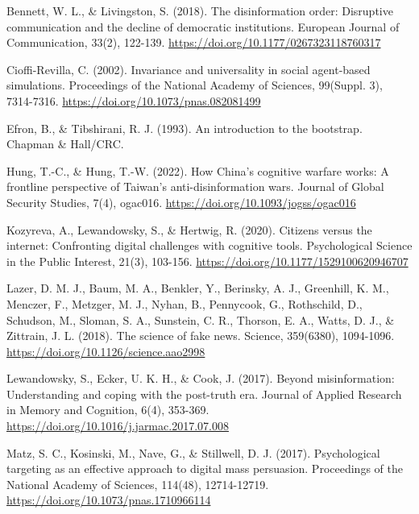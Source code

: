 \documentclass[11pt]{article}
\begin{document}
\noindent Bennett, W. L., \& Livingston, S. (2018). The disinformation order: Disruptive communication and the decline of democratic institutions. European Journal of Communication, 33(2), 122-139. \url{https://doi.org/10.1177/0267323118760317}\par

\noindent Cioffi-Revilla, C. (2002). Invariance and universality in social agent-based simulations. Proceedings of the National Academy of Sciences, 99(Suppl. 3), 7314-7316. \url{https://doi.org/10.1073/pnas.082081499}\par

\noindent Efron, B., \& Tibshirani, R. J. (1993). An introduction to the bootstrap. Chapman \& Hall/CRC.\par

\noindent Hung, T.-C., \& Hung, T.-W. (2022). How China's cognitive warfare works: A frontline perspective of Taiwan's anti-disinformation wars. Journal of Global Security Studies, 7(4), ogac016. \url{https://doi.org/10.1093/jogss/ogac016}\par

\noindent Kozyreva, A., Lewandowsky, S., \& Hertwig, R. (2020). Citizens versus the internet: Confronting digital challenges with cognitive tools. Psychological Science in the Public Interest, 21(3), 103-156. \url{https://doi.org/10.1177/1529100620946707}\par

\noindent Lazer, D. M. J., Baum, M. A., Benkler, Y., Berinsky, A. J., Greenhill, K. M., Menczer, F., Metzger, M. J., Nyhan, B., Pennycook, G., Rothschild, D., Schudson, M., Sloman, S. A., Sunstein, C. R., Thorson, E. A., Watts, D. J., \& Zittrain, J. L. (2018). The science of fake news. Science, 359(6380), 1094-1096. \url{https://doi.org/10.1126/science.aao2998}\par

\noindent Lewandowsky, S., Ecker, U. K. H., \& Cook, J. (2017). Beyond misinformation: Understanding and coping with the post-truth era. Journal of Applied Research in Memory and Cognition, 6(4), 353-369. \url{https://doi.org/10.1016/j.jarmac.2017.07.008}\par

\noindent Matz, S. C., Kosinski, M., Nave, G., \& Stillwell, D. J. (2017). Psychological targeting as an effective approach to digital mass persuasion. Proceedings of the National Academy of Sciences, 114(48), 12714-12719. \url{https://doi.org/10.1073/pnas.1710966114}\par
\end{document}

